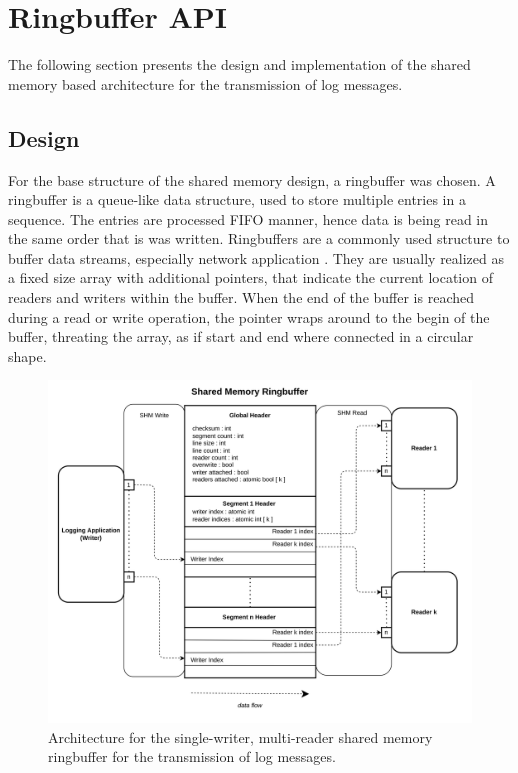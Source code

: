 \section{Ringbuffer API}

The following section presents the design and implementation of the shared memory based architecture for the transmission
of log messages. \\

\subsection{Design}
\label{sec:design}
For the base structure of the shared memory design, a ringbuffer was chosen. A ringbuffer is a queue-like data structure, used to store
multiple entries in a sequence. The entries are processed \ac{FIFO} manner, hence data is being read in the same order that is was written. 
Ringbuffers are a commonly used structure to buffer data streams, especially network application \cite{}.
They are usually realized as a fixed size array with additional pointers, that indicate the current location
of readers and writers within the buffer. When the end of the buffer is reached during a read or write operation, the pointer
wraps around to the begin of the buffer, threating the array, as if start and end where connected in a circular shape. 

\begin{figure}[h!]
    \label{fig:shm_architecture}
    \includegraphics[width=\textwidth]{images/shm_architecture.png}
    \caption[Shared Memory Architecture]{Architecture for the single-writer, multi-reader shared memory ringbuffer for the transmission
    of log messages. }
\end{figure}

